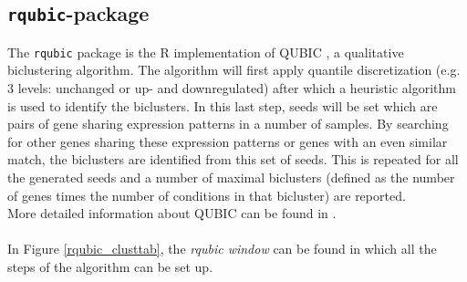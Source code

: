 \documentclass[a4paper]{article}\usepackage[]{graphicx}\usepackage[]{color}
\begin{document}
\subsection{\texttt{rqubic}-package}
\label{rqubicsection}
The \verb|rqubic| package is the R implementation of QUBIC \citep{Li2009}, a
qualitative biclustering algorithm. The algorithm will first apply quantile
discretization (e.g. 3 levels: unchanged or up- and downregulated) after which a
heuristic algorithm is used to identify the biclusters. In this last step, seeds
will be set which are pairs of gene sharing expression patterns in a number of
samples. By searching for other genes sharing these expression patterns or genes
with an even similar match, the biclusters are identified from this set of
seeds. This is repeated for all the generated seeds and a number of maximal
biclusters (defined as the number of genes times the number of conditions in
that bicluster) are reported.\\
More detailed information about QUBIC can be found in \citet{Li2009}.
\\ \\
\noindent In Figure \ref{rqubic_clusttab}, the {\it rqubic window} can be found
in which all the steps of the algorithm can be set up.
\end{document}
